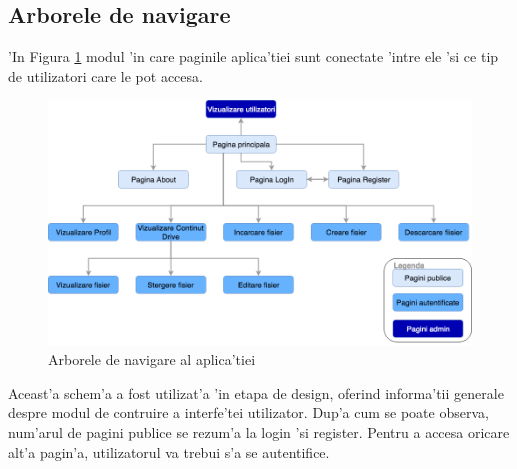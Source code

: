 \documentclass[12pt,a4paper,twoside]{report}
\begin{document}
\subsection{Arborele de navigare}
'In Figura \ref{sitemap} modul 'in care paginile aplica'tiei sunt conectate 'intre ele 'si ce tip de utilizatori care le pot accesa. 
\begin{figure}[H]
\begin{center}
\advance\leftskip-3cm
\advance\rightskip-3cm
\includegraphics[keepaspectratio=true,scale=0.42]{img/sitemap.png}
\caption{Arborele de navigare al aplica'tiei}
\label{sitemap}
\end{center}
\end{figure} 
Aceast'a schem'a a fost utilizat'a 'in etapa de design, oferind informa'tii generale despre modul de contruire a interfe'tei utilizator. 
Dup'a cum se poate observa, num'arul de pagini publice se rezum'a la login 'si register. Pentru a accesa oricare alt'a pagin'a, utilizatorul va trebui s'a se autentifice.
\end{document}
